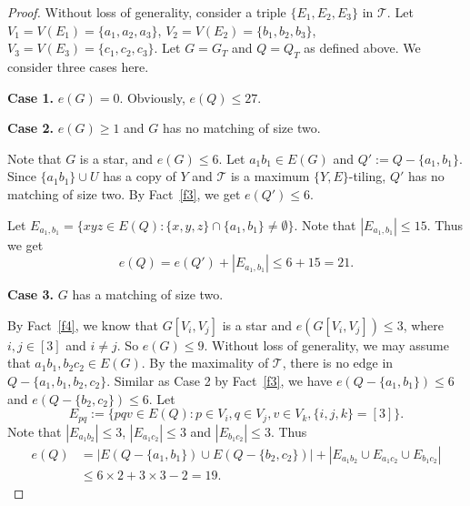 \documentclass[11pt, reqno]{amsart}    	%
\theoremstyle{definition}
\def\cT{\mathcal T}
\numberwithin{equation}{section}
\begin{document}
	\begin{proof}
		Without loss of generality, consider a triple $\{E_1,E_2,E_3\}$ in $\cT$.  Let $ V_{1}=V(E_1)=\{a_{1},a_{2},a_{3}\}$, $V_{2}=V(E_2)=\{b_{1},b_{2},b_{3}\}$, $V_{3}=V(E_3)=\{c_{1},c_{2},c_{3}\}$. 
		Let $G=G_T$ and $Q=Q_T$ as defined above.  We consider three cases here.
		
		\textbf{Case 1.} $ e(G)=0 $. Obviously, $ e(Q)\le 27 $.
		
		\textbf{Case 2.} $ e(G)\ge1 $ and $G$ has no matching of size two. 
		
		Note that $G$ is a star, and $ e(G)\le6$. 
		Let $a_{1}b_{1}\in E(G)$ and $Q':=Q-\{a_{1},b_{1}\}$. Since $\{a_{1}b_{1}\}\cup U$ has a copy of $Y$ and $\cT$ is a maximum $ \{Y,E\} $-tiling, $Q'$ has no matching of size two. By Fact~\ref{f3}, we get 	$ e(Q')\le 6 $.
		
		Let $ E_{a_{1},b_{1}} =\{xyz\in E(Q):\{x,y,z\}\cap\{a_{1},b_{1}\}\not= \emptyset\}$.
		Note that $ |E_{a_{1},b_{1}}|\le15. $ Thus we get
		\[e(Q)= e(Q')+|E_{a_{1},b_{1}}|\le 6+15=21.\]
		
		\textbf{Case 3.} $G$ has a matching of size two.
		
		By Fact~\ref{f4}, we know that $ G[V_{i},V_{j}] $ is a star and $e(G[V_{i},V_{j}])\le3$, where $i,j\in[3]$ and $i\not= j$. So $ e(G)\le9$.  Without loss of generality, we may assume that  $a_{1}b_{1},b_{2}c_{2}\in E(G)$. By the maximality of $\cT$, there is no edge in $Q-\{a_{1},b_{1}, b_{2},c_{2}\}$.
		Similar as Case 2 by  Fact~\ref{f3}, we have $e(Q-\{a_{1},b_{1}\})\le6$ and $e(Q-\{b_{2},c_{2}\})\le6$. 
		Let 
		\[E_{pq} := \{pqv\in E(Q): p\in V_i, q\in V_j, v\in V_k, \{i,j,k\}=[3] \}.\]
		Note that 
		$|E_{a_{1}b_{2}}| \le3$, $|E_{a_{1}c_{2}}|\le 3$ and $|E_{b_{1}c_{2}}|\le 3$.	
		Thus	
		\[\begin{split}e(Q)&=|E(Q-\{a_{1},b_{1}\})\cup E(Q-\{b_{2},c_{2}\})|+ |E_{a_{1}b_{2}} \cup E_{a_{1}c_{2}} \cup E_{b_{1}c_{2}}|%
			\\&\le 6\times2+3\times3-2=19.
		\end{split}\]
		

\end{proof}
\end{document}
